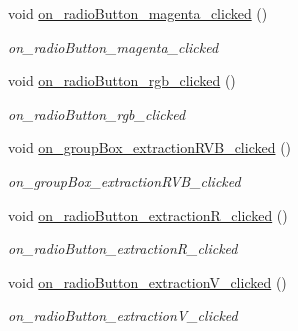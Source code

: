 \begin{DoxyCompactItemize}
\mbox{\label{classAppMainWindow_a785f5e333d62dba43501387794e36f94}} 
void \hyperlink{classAppMainWindow_a785f5e333d62dba43501387794e36f94}{on\+\_\+radio\+Button\+\_\+magenta\+\_\+clicked} ()
\begin{DoxyCompactList}\small\item\em on\+\_\+radio\+Button\+\_\+magenta\+\_\+clicked \end{DoxyCompactList}\item 
\mbox{\label{classAppMainWindow_a17792a2be779a477e8b39f6101934453}} 
void \hyperlink{classAppMainWindow_a17792a2be779a477e8b39f6101934453}{on\+\_\+radio\+Button\+\_\+rgb\+\_\+clicked} ()
\begin{DoxyCompactList}\small\item\em on\+\_\+radio\+Button\+\_\+rgb\+\_\+clicked \end{DoxyCompactList}\item 
\mbox{\label{classAppMainWindow_aa8f659155495c4654b58a81402e15c62}} 
void \hyperlink{classAppMainWindow_aa8f659155495c4654b58a81402e15c62}{on\+\_\+group\+Box\+\_\+extraction\+R\+V\+B\+\_\+clicked} ()
\begin{DoxyCompactList}\small\item\em on\+\_\+group\+Box\+\_\+extraction\+R\+V\+B\+\_\+clicked \end{DoxyCompactList}\item 
\mbox{\label{classAppMainWindow_a99efb1da0e9cf4ea1e12a43f8aff9402}} 
void \hyperlink{classAppMainWindow_a99efb1da0e9cf4ea1e12a43f8aff9402}{on\+\_\+radio\+Button\+\_\+extraction\+R\+\_\+clicked} ()
\begin{DoxyCompactList}\small\item\em on\+\_\+radio\+Button\+\_\+extraction\+R\+\_\+clicked \end{DoxyCompactList}\item 
\mbox{\label{classAppMainWindow_a05522b3bbaeab71f9f16db88e5a34ccc}} 
void \hyperlink{classAppMainWindow_a05522b3bbaeab71f9f16db88e5a34ccc}{on\+\_\+radio\+Button\+\_\+extraction\+V\+\_\+clicked} ()
\begin{DoxyCompactList}\small\item\em on\+\_\+radio\+Button\+\_\+extraction\+V\+\_\+clicked \end{DoxyCompactList}\item 

\end{DoxyCompactItemize}
